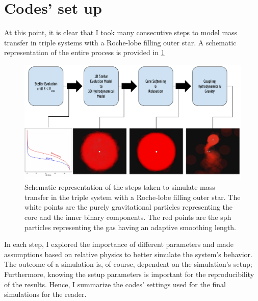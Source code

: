 \section{Codes' set up}

At this point, it is clear that I took many consecutive steps to model mass transfer in triple systems with a Roche-lobe filling outer star. A schematic representation of the entire process is provided in \cref{fig:schematic_method}
\begin{figure}[H]
    \centering
    \includegraphics[width=\textwidth]{Thesis/figures/method_schematic.pdf}
    \caption{Schematic representation of the steps taken to simulate mass transfer in the triple system with a Roche-lobe filling outer star. The white points are the purely gravitational particles representing the core and the inner binary components. The red points are the \ac{sph} particles representing the gas having an adaptive smoothing length.}
    \label{fig:schematic_method}
\end{figure}
In each step, I explored the importance of different parameters and made assumptions based on relative physics to better simulate the system's behavior. The outcome of a simulation is, of course, dependent on the simulation's setup; Furthermore, knowing the setup parameters is important for the reproducibility of the results. Hence, I summarize the codes' settings used for the final simulations for the reader.
